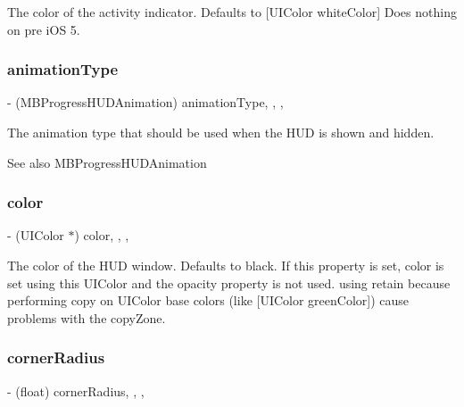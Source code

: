 The color of the activity indicator. Defaults to \mbox{[}U\+I\+Color white\+Color\mbox{]} Does nothing on pre i\+OS 5. \mbox{\label{interface_m_b_progress_h_u_d_a71d04bb9e2839df9377ad10d03b2e468}} 
\subsubsection{\texorpdfstring{animation\+Type}{animationType}}
{\footnotesize\ttfamily -\/ (M\+B\+Progress\+H\+U\+D\+Animation) animation\+Type\hspace{0.3cm}{\ttfamily [read]}, {\ttfamily [write]}, {\ttfamily [atomic]}, {\ttfamily [assign]}}

The animation type that should be used when the H\+UD is shown and hidden.

\begin{DoxySeeAlso}{See also}
M\+B\+Progress\+H\+U\+D\+Animation 
\end{DoxySeeAlso}
\mbox{\label{interface_m_b_progress_h_u_d_adcd50b7dff312bb10e69588f40325f0f}} 
\subsubsection{\texorpdfstring{color}{color}}
{\footnotesize\ttfamily -\/ (U\+I\+Color $\ast$) color\hspace{0.3cm}{\ttfamily [read]}, {\ttfamily [write]}, {\ttfamily [atomic]}, {\ttfamily [assign]}}

The color of the H\+UD window. Defaults to black. If this property is set, color is set using this U\+I\+Color and the opacity property is not used. using retain because performing copy on U\+I\+Color base colors (like \mbox{[}U\+I\+Color green\+Color\mbox{]}) cause problems with the copy\+Zone. \mbox{\label{interface_m_b_progress_h_u_d_a8a3573dbf4dcdeeb187a08d0070e811c}} 
\subsubsection{\texorpdfstring{corner\+Radius}{cornerRadius}}
{\footnotesize\ttfamily -\/ (float) corner\+Radius\hspace{0.3cm}{\ttfamily [read]}, {\ttfamily [write]}, {\ttfamily [atomic]}, {\ttfamily [assign]}}

